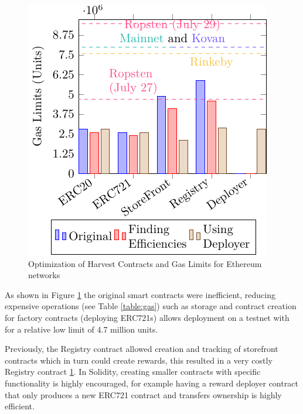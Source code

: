 \documentclass[12pt,tightenlines,letterpaper]{scrartcl}
\begin{document}
  
\begin{figure}[H]
\centering
\includegraphics[width=1\linewidth]{Images/gasCost}
\caption{Optimization of Harvest Contracts and Gas Limits for Ethereum networks}
\label{fig:gascost}
\end{figure}
As shown in Figure \ref{fig:gascost} the original smart contracts were inefficient, reducing expensive operations (see Table \ref{table:gas}) such as storage and contract creation for factory contracts (deploying ERC721s) allows deployment on a testnet with for a relative low limit of 4.7 million units.

Previously, the Registry contract allowed creation and tracking of storefront contracts which in turn could create rewards, this resulted in a very costly Registry contract \ref{fig:gascost}.
In Solidity, creating smaller contracts with specific functionality is highly encouraged, for example having a reward deployer contract that only produces a new ERC721 contract and transfers ownership is highly efficient.
 


 
 
\end{document}
